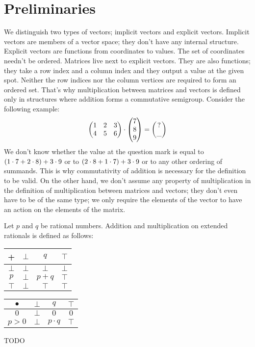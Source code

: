 \documentclass[]{article}
\begin{document}
\section{Preliminaries}

We distinguish two types of vectors; implicit vectors and explicit vectors.
Implicit vectors are members of a vector space; they don't have any internal structure.
Explicit vectors are functions from coordinates to values.
The set of coordinates needn't be ordered.
Matrices live next to explicit vectors. They are also functions; they take a row index
and a column index and they output a value at the given spot.
Neither the row indices nor the column vertices are required to form an ordered set.
That's why multiplication between matrices and vectors is defined only in structures
where addition forms a commutative semigroup. Consider the following example:
$$
\begin{pmatrix}
	1 & 2 & 3 \\
	4 & 5 & 6 \\
\end{pmatrix}
\cdot
\begin{pmatrix}
	7 \\ 8 \\ 9
\end{pmatrix}
=
\begin{pmatrix}
	? \\ \_
\end{pmatrix}
$$
We don't know whether the value at the question mark is equal to
$ (1 \cdot 7 + 2 \cdot 8) + 3 \cdot 9 $ or to
$ (2 \cdot 8 + 1 \cdot 7) + 3 \cdot 9 $ or to
any other ordering of summands.
This is why commutativity of addition is necessary for the definition to be valid.
On the other hand, we don't assume any property of multiplication in the
definition of multiplication between matrices and vectors; they don't even
have to be of the same type; we only require the elements of the vector
to have an action on the elements of the matrix.

Let $p$ and $q$ be rational numbers.
Addition and multiplication on extended rationals is defined as follows:
\begin{center}
	\begin{tabular}{ c || c | c | c | }
		+ & $\bot$ & $q$ & $\top$  \\
		\hline\hline
		$\bot$ & $\bot$ & $\bot$ & $\bot$  \\ 
		\hline
		$p$ & $\bot$ & $p\!+\!q$ & $\top$  \\ 
		\hline
		$\top$ & $\bot$ & $\top$ & $\top$ \\ 
		\hline
	\end{tabular}
	\qquad\qquad\qquad
	\begin{tabular}{ c || c | c | c | }
		$\bullet$ & $\bot$ & $q$ & $\top$  \\
		\hline\hline
		$0$ & $\bot$ & $0$ & $0$  \\ 
		\hline
		$p>0$ & $\bot$ & $p \cdot q$ & $\top$  \\ 
		\hline
	\end{tabular}
\end{center}
TODO
\end{document}
